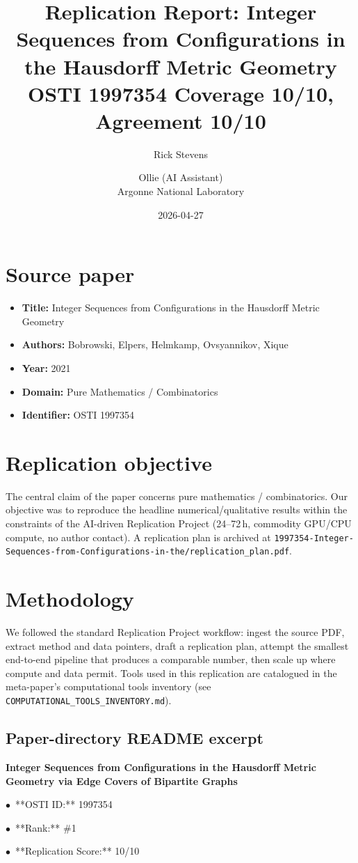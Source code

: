 \documentclass[11pt]{article}
\title{Replication Report: Integer Sequences from Configurations in the Hausdorff Metric Geometry\\[2pt]\large OSTI 1997354 \textbar{} Coverage 10/10, Agreement 10/10}
\author{Rick Stevens \and Ollie (AI Assistant)\\\small Argonne National Laboratory}
\date{2026-04-27}
\begin{document}
\maketitle

\section{Source paper}
\begin{itemize}
\item \textbf{Title:} Integer Sequences from Configurations in the Hausdorff Metric Geometry
\item \textbf{Authors:} Bobrowski, Elpers, Helmkamp, Ovsyannikov, Xique
\item \textbf{Year:} 2021
\item \textbf{Domain:} Pure Mathematics / Combinatorics
\item \textbf{Identifier:} OSTI 1997354
\end{itemize}


\section{Replication objective}
The central claim of the paper concerns pure mathematics / combinatorics. Our objective was to reproduce the headline numerical/qualitative results within the constraints of the AI-driven Replication Project (24--72\,h, commodity GPU/CPU compute, no author contact). A replication plan is archived at \texttt{1997354-Integer-Sequences-from-Configurations-in-the/replication\_plan.pdf}.

\section{Methodology}
We followed the standard Replication Project workflow: ingest the source PDF, extract method and data pointers, draft a replication plan, attempt the smallest end-to-end pipeline that produces a comparable number, then scale up where compute and data permit. Tools used in this replication are catalogued in the meta-paper's computational tools inventory (see \texttt{COMPUTATIONAL\_TOOLS\_INVENTORY.md}).



\subsection*{Paper-directory README excerpt}
\small
\par\medskip\textbf{Integer Sequences from Configurations in the Hausdorff Metric Geometry via Edge Covers of Bipartite Graphs}\par
\par$\bullet$\ **OSTI ID:** 1997354
\par$\bullet$\ **Rank:** \#1
\par$\bullet$\ **Replication Score:** 10/10
\end{document}
